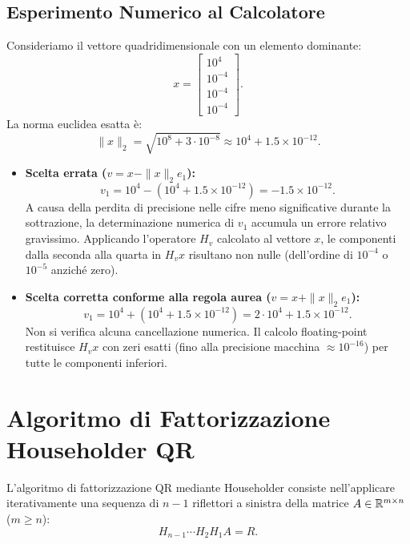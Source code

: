 \subsection{Esperimento Numerico al Calcolatore}
Consideriamo il vettore quadridimensionale con un elemento dominante:
\begin{equation}
    x = \begin{bmatrix} 10^4 \\ 10^{-4} \\ 10^{-4} \\ 10^{-4} \end{bmatrix}.
\end{equation}
La norma euclidea esatta \`e:
\begin{equation}
    \|x\|_2 = \sqrt{10^8 + 3 \cdot 10^{-8}} \approx 10^4 + 1.5 \times 10^{-12}.
\end{equation}
\begin{itemize}
    \item \textbf{Scelta errata ($v = x - \|x\|_2 e_1$):}
    \begin{equation}
        v_1 = 10^4 - (10^4 + 1.5 \times 10^{-12}) = -1.5 \times 10^{-12}.
    \end{equation}
    A causa della perdita di precisione nelle cifre meno significative durante la sottrazione, la determinazione numerica di $v_1$ accumula un errore relativo gravissimo. Applicando l'operatore $H_v$ calcolato al vettore $x$, le componenti dalla seconda alla quarta in $H_v x$ risultano non nulle (dell'ordine di $10^{-4}$ o $10^{-5}$ anzich\'e zero).
    \item \textbf{Scelta corretta conforme alla regola aurea ($v = x + \|x\|_2 e_1$):}
    \begin{equation}
        v_1 = 10^4 + (10^4 + 1.5 \times 10^{-12}) = 2 \cdot 10^4 + 1.5 \times 10^{-12}.
    \end{equation}
    Non si verifica alcuna cancellazione numerica. Il calcolo floating-point restituisce $H_v x$ con zeri esatti (fino alla precisione macchina $\approx 10^{-16}$) per tutte le componenti inferiori.
\end{itemize}

\FloatBarrier
\section{Algoritmo di Fattorizzazione Householder QR}
\label{sec:algoritmo-householder-qr}

L'algoritmo di fattorizzazione QR mediante Householder consiste nell'applicare iterativamente una sequenza di $n - 1$ riflettori a sinistra della matrice $A \in \mathbb{R}^{m \times n}$ ($m \ge n$):
\begin{equation}
    H_{n-1} \cdots H_2 H_1 A = R.
\end{equation}

